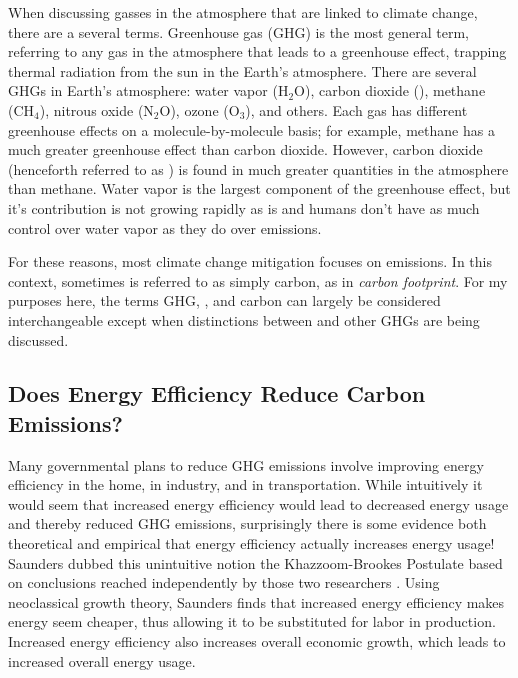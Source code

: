 When discussing gasses in the atmosphere that are linked to climate change, there are a several terms. Greenhouse gas (GHG) is the most general term, referring to any gas in the atmosphere that leads to a greenhouse effect, trapping thermal radiation from the sun in the Earth's atmosphere. There are several GHGs in Earth's atmosphere: water vapor (H$_2$O), carbon dioxide (\COtwo), methane (CH$_4$), nitrous oxide (N$_2$O), ozone (O$_3$), and others. Each gas has different greenhouse effects on a molecule-by-molecule basis; for example, methane has a much greater greenhouse effect than carbon dioxide.  However, carbon dioxide (henceforth referred to as \COtwo) is found in much greater quantities in the atmosphere than methane. Water vapor is the largest component of the greenhouse effect, but it's contribution is not growing rapidly as \COtwo is and humans don't have as much control over water vapor as they do over \COtwo emissions.

For these reasons, most climate change mitigation focuses on \COtwo emissions. In this context, sometimes \COtwo is referred to as simply carbon, as in \emph{carbon footprint}. For my purposes here, the terms GHG, \COtwo, and carbon can largely be considered interchangeable except when distinctions between \COtwo and other GHGs are being discussed.

\subsection{Does Energy Efficiency Reduce Carbon Emissions?}

Many governmental plans to reduce GHG emissions involve improving energy efficiency in the home, in industry, and in transportation. While intuitively it would seem that increased energy efficiency would lead to decreased energy usage and thereby reduced GHG emissions, surprisingly there is some evidence both theoretical and empirical that energy efficiency actually increases energy usage! Saunders dubbed this unintuitive notion the Khazzoom-Brookes Postulate based on conclusions reached independently by those two researchers \cite{saunders-1992}.
Using neoclassical growth theory, Saunders finds that increased energy efficiency makes energy seem cheaper, thus allowing it to be substituted for labor in production. Increased energy efficiency also increases overall economic growth, which leads to increased overall energy usage.

